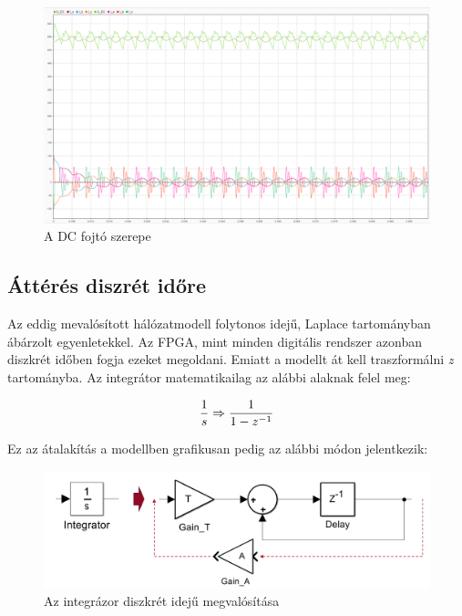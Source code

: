 \begin{figure}[H!]
	\centering
	\includegraphics[width = \textwidth]{figures/choke_vs_nochoke_11A.png}
	\caption{A DC fojtó szerepe} 
	\label{fig:chokenochoke}
\end{figure}



\subsection{Áttérés diszrét időre}

Az eddig mevalósított hálózatmodell folytonos idejű, Laplace tartományban ábárzolt egyenletekkel. Az FPGA, mint minden digitális rendszer azonban diszkrét időben fogja ezeket megoldani. Emiatt a modellt át kell traszformálni \emph{z} tartományba. Az integrátor matematikailag az alábbi alaknak felel meg:

\begin{equation}
\centering
\frac{1}{s} \Rightarrow \frac{1}{1-z^{-1}}
\end{equation}

Ez az átalakítás a modellben grafikusan pedig az alábbi módon jelentkezik:

\begin{figure}[h]
	\centering
	\includegraphics[width = \textwidth]{figures/integrator.png}
	\caption{Az integrázor diszkrét idejű megvalósítása} 
	\label{fig:integrator}
\end{figure}

